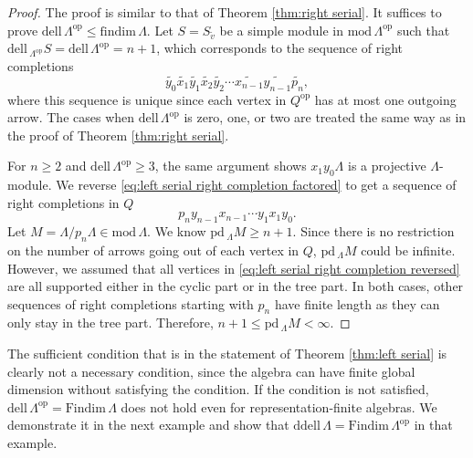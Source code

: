 \documentclass{conm-p-l}
\newcommand{\findim}{\mathrm{findim}\,}
\newcommand{\Findim}{\mathrm{Findim}\,}
\newcommand{\dell}{\mathrm{dell}\,}
\renewcommand{\dell}{\mathrm{dell}\,}
\newcommand{\pd}{\mathrm{pd}\,}
\newcommand{\op}{\mathrm{op}}
\renewcommand{\mod}{\mathrm{mod}\,}
\newcommand{\ddell}{\mathrm{ddell}\,}
\theoremstyle{definition}
\theoremstyle{remark}
\numberwithin{equation}{section}
\begin{document}
\begin{proof}
The proof is similar to that of Theorem \ref{thm:right serial}. It suffices to prove $\dell\Lambda^{\op}\leq\findim\Lambda$. Let $S=S_{\tilde{v}}$ be a simple module in $\mod\Lambda^{\op}$ such that $\dell\!_{\Lambda^{\op}} S = \dell\Lambda^{\op} = n+1$, which corresponds to the sequence of right completions
\begin{equation}
\label{eq:left serial right completion factored}
\widetilde{y_0}\widetilde{x_1}\widetilde{y_1}\widetilde{x_2}\widetilde{y_2} \cdots \widetilde{x_{n-1}}\widetilde{y_{n-1}}\widetilde{p_n},
\end{equation}
where this sequence is unique since each vertex in $Q^{\op}$ has at most one outgoing arrow. The cases when $\dell\Lambda^{\op}$ is zero, one, or two are treated the same way as in the proof of Theorem \ref{thm:right serial}.

For $n\geq 2$ and $\dell\Lambda^{\op}\geq 3$, the same argument shows $x_1y_0\Lambda$ is a projective $\Lambda$-module. We reverse \eqref{eq:left serial right completion factored} to get a sequence of right completions in $Q$
\begin{equation}
\label{eq:left serial right completion reversed}
p_n y_{n-1}x_{n-1}\cdots y_1x_1y_0.
\end{equation}
Let $M=\Lambda/p_n\Lambda\in\mod\Lambda$. We know $\pd\!_{\Lambda} M\geq n+1$. Since there is no restriction on the number of arrows going out of each vertex in $Q$, $\pd\!_{\Lambda} M$ could be infinite. However, we assumed that all vertices in \eqref{eq:left serial right completion reversed} are all supported either in the cyclic part or in the tree part. In both cases, other sequences of right completions starting with $p_n$ have finite length as they can only stay in the tree part. Therefore, $n+1\leq\pd\!_{\Lambda} M<\infty$.

\end{proof}

The sufficient condition that is in the statement of Theorem \ref{thm:left serial} is clearly not a necessary condition, since the algebra can have finite global dimension without satisfying the condition. If the condition is not satisfied, $\dell\Lambda^{\op}=\Findim\Lambda$ does not hold even for representation-finite algebras. We demonstrate it in the next example and show that $\ddell\Lambda=\Findim\Lambda^{\op}$ in that example.
\end{document}

